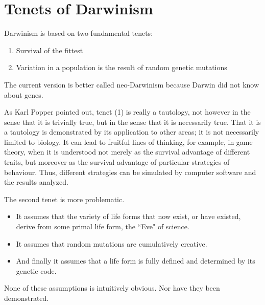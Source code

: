 \section{Tenets of Darwinism}

Darwinism is based on two fundamental tenets:

\begin{enumerate}
\item Survival of the fittest 
\item Variation in a population is the result of random genetic mutations 
\end{enumerate}
The current version is better called neo-Darwinism because Darwin did not know about genes.

As Karl Popper pointed out, tenet (1) is really a tautology, not however in the sense that it is trivially true, but in
the sense that it is necessarily true. That it is a tautology is demonstrated by its application to other areas; it is
not necessarily limited to biology. It can lead to fruitful lines of thinking, for example, in game theory, when it is
understood not merely as the survival advantage of different traits, but moreover as the survival advantage of
particular strategies of behaviour. Thus, different strategies can be simulated by computer software and the results
analyzed. 

The second tenet is more problematic. 

\begin{itemize}
\item It assumes that the variety of life forms that now exist, or have existed, derive from some primal life form, the
``Eve" of science. 
\item It assumes that random mutations are cumulatively creative. 
\item And finally it assumes that a life form is fully defined and determined by its genetic code. 
\end{itemize}
None of these assumptions is intuitively obvious. Nor have they been demonstrated.



